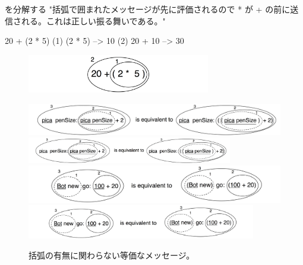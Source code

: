 \documentclass[a4paper,10pt,twoside]{book}
\begin{document}
\begin{example}[mathcorrect]{ を分解する}{}
"括弧で囲まれたメッセージが先に評価されるので * が + の前に送信される。これは正しい振る舞いである。"

    20 + (2 * 5)
(1)        (2 * 5) --> 10
(2) 20 + 10      --> 30
\end{example}

\begin{figure}
\begin{center}
\includegraphics[width=8cm]{ucompoNumberBracket}
\end{center}
\end{figure}



\begin{figure}
\begin{center}
\ifluluelse
	{\includegraphics[width=\textwidth]{uKeyUnBinPar}}
	{\includegraphics[width=0.8\textwidth]{uKeyUnBinPar}}
\ifluluelse
	{\includegraphics[width=\textwidth]{uunKeyBinPar}}
	{\includegraphics[width=10cm]{uunKeyBinPar}}
\end{center}
\caption{括弧の有無に関わらない等価なメッセージ。}
\end{figure}
\end{document}
